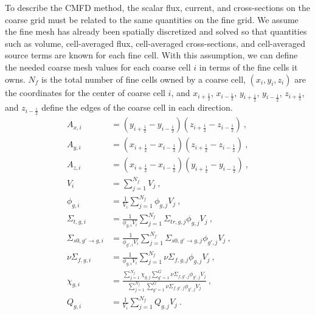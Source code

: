 To describe the CMFD method, the scalar flux, current, and cross-sections on the coarse grid must be related to the same quantities on the fine grid.  We assume the fine mesh has already been spatially discretized and solved so that quantities such as volume, cell-averaged flux, cell-averaged cross-sections, and cell-averaged source terms are known for each fine cell.  With this assumption, we can define the needed coarse mesh values for each coarse cell $i$ in terms of the fine cells it owns.  $N_f$ is the total number of fine cells owned by a coarse cell, $\left(x_i,y_i,z_i\right)$ are the coordinates for the center of coarse cell $i$, and $x_{i+\frac{1}{2}}$, $x_{i-\frac{1}{2}}$, $y_{i+\frac{1}{2}}$, $y_{i-\frac{1}{2}}$, $z_{i+\frac{1}{2}}$, and $z_{i-\frac{1}{2}}$ define the edges of the coarse cell in each direction.
\begin{subequations}\label{e:CMFDhomogTerms}
\begin{align}
A_{x,i} &= \left(y_{i+\frac{1}{2}} - y_{i-\frac{1}{2}}\right)\left(z_{i+\frac{1}{2}} - z_{i-\frac{1}{2}}\right) \ ,\\
A_{y,i} &= \left(x_{i+\frac{1}{2}} - x_{i-\frac{1}{2}}\right)\left(z_{i+\frac{1}{2}} - z_{i-\frac{1}{2}}\right) \ ,\\
A_{z,i} &= \left(x_{i+\frac{1}{2}} - x_{i-\frac{1}{2}}\right)\left(y_{i+\frac{1}{2}} - y_{i-\frac{1}{2}}\right) \ ,\\
V_i &= \sum_{j=1}^{N_f} V_j \ ,\\
\phi_{g,i} &= \frac{1}{V_i}\sum_{j=1}^{N_f} \phi_{g,j} V_j \label{e:CMFDhomogFlux}\ ,\\
\Sigma_{t,g,i} &= \frac{1}{\phi_{g,i} V_i}\sum_{j=1}^{N_f} \Sigma_{tr,g,j} \phi_{g,j} V_j \ ,\\
\Sigma_{s0,g'\rightarrow g,i} &= \frac{1}{\phi_{g',i} V_i}\sum_{j=1}^{N_f} \Sigma_{s0,g'\rightarrow g,j} \phi_{g',j} V_j \ ,\\
\nu\Sigma_{f,g,i} &= \frac{1}{\phi_{g,i} V_i}\sum_{j=1}^{N_f} \nu\Sigma_{f,g,j} \phi_{g,j} V_j \ ,\\
\chi_{g,i} &= \frac{\sum_{j=1}^{N_f} \chi_{g,j} \sum_{g'=1}^G \nu\Sigma_{f,g',j} \phi_{g',j} V_j}{\sum_{j=1}^{N_f} \sum_{g'=1}^G \nu\Sigma_{f,g',j} \phi_{g',j} V_j} \ ,\\
Q_{g,i} &= \frac{1}{V_i}\sum_{j=1}^{N_f} Q_{g,j} V_j\ .
\end{align}
\end{subequations}


